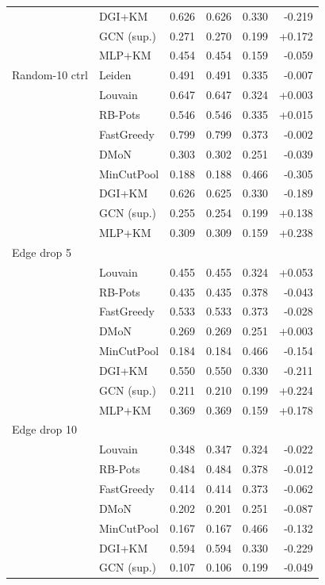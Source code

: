 \begin{table}[ht]
\begin{tabular}{llrrrr}
 & DGI+KM & 0.626 & 0.626 & 0.330 & -0.219 \\
 & GCN (sup.) & 0.271 & 0.270 & 0.199 & +0.172 \\
 & MLP+KM & 0.454 & 0.454 & 0.159 & -0.059 \\
\midrule
Random-10 ctrl & Leiden & 0.491 & 0.491 & 0.335 & -0.007 \\
 & Louvain & 0.647 & 0.647 & 0.324 & +0.003 \\
 & RB-Pots & 0.546 & 0.546 & 0.335 & +0.015 \\
 & FastGreedy & 0.799 & 0.799 & 0.373 & -0.002 \\
 & DMoN & 0.303 & 0.302 & 0.251 & -0.039 \\
 & MinCutPool & 0.188 & 0.188 & 0.466 & -0.305 \\
 & DGI+KM & 0.626 & 0.625 & 0.330 & -0.189 \\
 & GCN (sup.) & 0.255 & 0.254 & 0.199 & +0.138 \\
 & MLP+KM & 0.309 & 0.309 & 0.159 & +0.238 \\
\midrule
Edge drop 5\\%
 & Louvain & 0.455 & 0.455 & 0.324 & +0.053 \\
 & RB-Pots & 0.435 & 0.435 & 0.378 & -0.043 \\
 & FastGreedy & 0.533 & 0.533 & 0.373 & -0.028 \\
 & DMoN & 0.269 & 0.269 & 0.251 & +0.003 \\
 & MinCutPool & 0.184 & 0.184 & 0.466 & -0.154 \\
 & DGI+KM & 0.550 & 0.550 & 0.330 & -0.211 \\
 & GCN (sup.) & 0.211 & 0.210 & 0.199 & +0.224 \\
 & MLP+KM & 0.369 & 0.369 & 0.159 & +0.178 \\
\midrule
Edge drop 10\\%
 & Louvain & 0.348 & 0.347 & 0.324 & -0.022 \\
 & RB-Pots & 0.484 & 0.484 & 0.378 & -0.012 \\
 & FastGreedy & 0.414 & 0.414 & 0.373 & -0.062 \\
 & DMoN & 0.202 & 0.201 & 0.251 & -0.087 \\
 & MinCutPool & 0.167 & 0.167 & 0.466 & -0.132 \\
 & DGI+KM & 0.594 & 0.594 & 0.330 & -0.229 \\
 & GCN (sup.) & 0.107 & 0.106 & 0.199 & -0.049 \\

\end{tabular}
\end{table}

